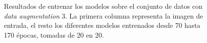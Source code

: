 \begin{figure}[H]
\centering
    \caption{Resultados de entrenar los modelos sobre el conjunto de datos con \textit{data augmentation} 3. La primera columna representa la imagen de entrada, el resto los diferentes modelos entrenados desde 70 hasta 170 épocas, tomadas de 20 en 20.}
\end{figure}

